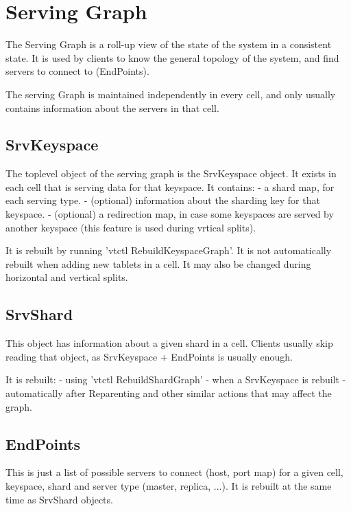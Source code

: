 \section{Serving Graph}\label{Serving-Graph}

The Serving Graph is a roll-up view of the state of the system in a consistent state. It is used by clients to know
the general topology of the system, and find servers to connect to (EndPoints).

The serving Graph is maintained independently in every cell, and only usually contains information about the servers
in that cell.

\subsection{SrvKeyspace}\hypertarget{srvkeyspace}{}\label{srvkeyspace}

The toplevel object of the serving graph is the SrvKeyspace object. It exists in each cell that is serving data for
that keyspace. It contains:
- a shard map, for each serving type.
- (optional) information about the sharding key for that keyspace.
- (optional) a redirection map, in case some keyspaces are served by another keyspace (this feature is used during
vrtical splits).

It is rebuilt by running 'vtctl RebuildKeyspaceGraph'. It is not automatically rebuilt when adding new tablets in a cell.
It may also be changed during horizontal and vertical splits.

\subsection{SrvShard}\hypertarget{srvshard}{}\label{srvshard}

This object has information about a given shard in a cell. Clients usually skip reading that object, as SrvKeyspace + EndPoints
is usually enough.

It is rebuilt:
- using 'vtctl RebuildShardGraph'
- when a SrvKeyspace is rebuilt
- automatically after Reparenting and other similar actions that may affect the graph.

\subsection{EndPoints}\hypertarget{endpoints}{}\label{endpoints}

This is just a list of possible servers to connect (host, port map) for a given cell, keyspace, shard and server type
(master, replica, ...). It is rebuilt at the same time as SrvShard objects.

